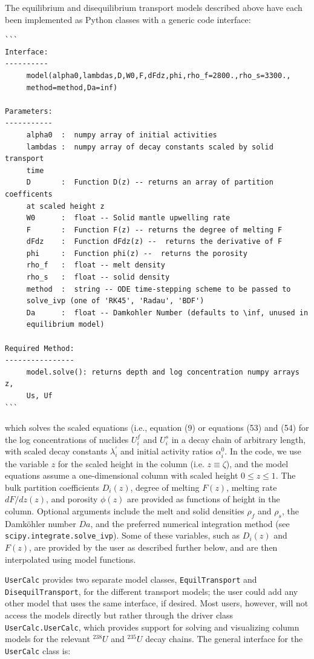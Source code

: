 \documentclass[draft]{agujournal2019}
\begin{document}
The equilibrium and disequilibrium transport models described above have each been implemented as Python classes with a generic code interface:

\sffamily
\color{purple}
\begin{verbatim}
```
Interface:
----------
     model(alpha0,lambdas,D,W0,F,dFdz,phi,rho_f=2800.,rho_s=3300.,
     method=method,Da=inf)

Parameters:
-----------
     alpha0  :  numpy array of initial activities
     lambdas :  numpy array of decay constants scaled by solid transport 
     time
     D       :  Function D(z) -- returns an array of partition coefficents 
     at scaled height z
     W0      :  float -- Solid mantle upwelling rate
     F       :  Function F(z) -- returns the degree of melting F
     dFdz    :  Function dFdz(z) --  returns the derivative of F
     phi     :  Function phi(z) --  returns the porosity
     rho_f   :  float -- melt density
     rho_s   :  float -- solid density
     method  :  string -- ODE time-stepping scheme to be passed to 
     solve_ivp (one of 'RK45', 'Radau', 'BDF')
     Da      :  float -- Damkohler Number (defaults to \inf, unused in 
     equilibrium model)

Required Method:
----------------
     model.solve(): returns depth and log concentration numpy arrays  z, 
     Us, Uf
```
\end{verbatim}

\color{black}
\normalfont
which solves the scaled equations (i.e., equation (9) or equations (53) and (54) for the log concentrations of nuclides $U_i^f$ and $U_i^s$ in a decay chain of arbitrary length, with scaled decay constants $\lambda^\prime_i$ and initial activity ratios $\alpha_i^0$. In the code, we use the variable $z$ for the scaled height in the column (i.e. $z\equiv \zeta$), and the model equations assume a one-dimensional column with scaled height $0 \leq z \leq 1$. The bulk partition coefficients $D_i(z)$, degree of melting $F(z)$, melting rate $dF/dz(z)$, and porosity $\phi(z)$ are provided as functions of height in the column. Optional arguments include the melt and solid densities $\rho_f$ and $\rho_s$, the Damk\"{o}hler number $Da$, and the preferred numerical integration method (see \colorbox{gray!20}{\texttt{scipy.integrate.solve\_ivp}}). Some of these variables, such as $D_i(z)$ and $F(z)$, are provided by the user as described further below, and are then interpolated using model functions.

\colorbox{gray!20}{\texttt{UserCalc}} provides two separate model classes, \colorbox{gray!20}{\texttt{EquilTransport}} and \colorbox{gray!20}{\texttt{DisequilTransport}}, for the different transport models; the user could add any other model that uses the same interface, if desired. Most users, however, will not access the models directly but rather through the driver class \colorbox{gray!20}{\texttt{UserCalc.UserCalc}}, which provides support for solving and visualizing column models for the relevant $^{238}U$ and $^{235}U$ decay chains. The general interface for the \colorbox{gray!20}{\texttt{UserCalc}} class is:
\end{document}
